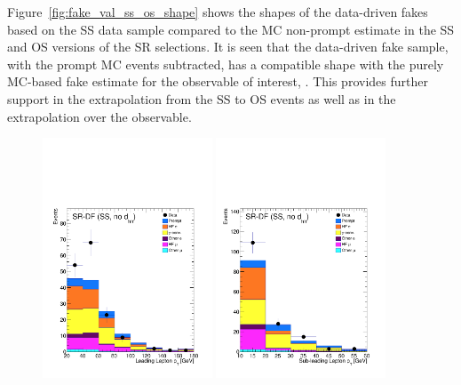 Figure~\ref{fig:fake_val_ss_os_shape} shows the shapes of the data-driven fakes based on the SS data sample
compared to the MC non-prompt estimate in the SS and OS versions of the SR selections.
It is seen that the data-driven fake sample, with the prompt MC events subtracted, has a compatible
shape with the purely MC-based fake estimate for the observable of interest, \dhh.
This provides further support in the extrapolation from the SS to OS events as well as in the extrapolation
over the \dhh observable.

\begin{figure}[!htb]
    \begin{center}
    \includegraphics[width=0.45\textwidth]{figures/search_hh/bkg_estimate/fake/fake_val_sr_df_ss_l0_pt}
    \includegraphics[width=0.45\textwidth]{figures/search_hh/bkg_estimate/fake/fake_val_sr_df_ss_l1_pt}

\end{center}
\end{figure}
